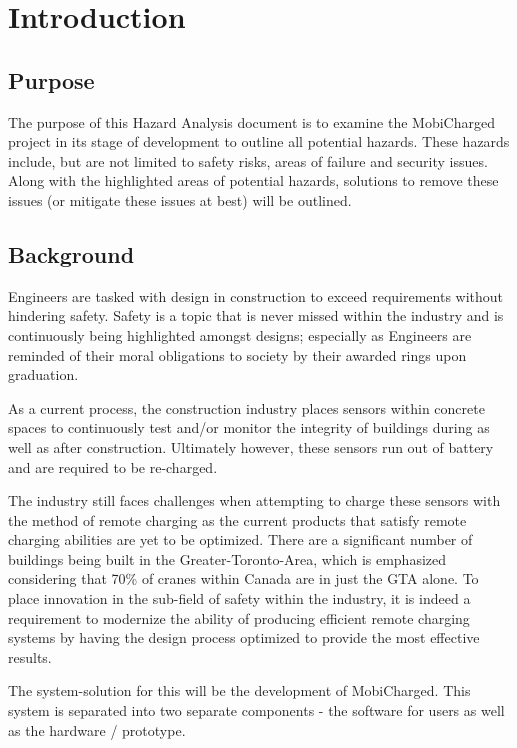 \documentclass[12pt, titlepage]{article}
\begin{document}
\section{Introduction}

\subsection{Purpose}
The purpose of this Hazard Analysis document is to examine the MobiCharged project in its stage of development to outline all potential hazards. These hazards include, but are not limited to safety risks, areas of failure and security issues. Along with the highlighted areas of potential hazards, solutions to remove these issues (or mitigate these issues at best) will be outlined.

\subsection{Background}
Engineers are tasked with design in construction to exceed requirements without hindering safety. Safety is a topic that is never missed within the industry and is continuously being highlighted amongst designs; especially as Engineers are reminded of their moral obligations to society by their awarded rings upon graduation. 
\par
As a current process, the construction industry places sensors within concrete spaces to continuously test and/or monitor the integrity of buildings during as well as after construction. Ultimately however, these sensors run out of battery and are required to be re-charged.
\par
The industry still faces challenges when attempting to charge these sensors with the method of remote charging as the current products that satisfy remote charging abilities are yet to be optimized. There are a significant number of buildings being built in the Greater-Toronto-Area, which is emphasized considering that 70\% of cranes within Canada are in just the GTA alone. To place innovation in the sub-field of safety within the industry, it is indeed a requirement to modernize the ability of producing efficient remote charging systems by having the design process optimized to provide the most effective results.
\par
The system-solution for this will be the development of MobiCharged. This system is separated into two separate components - the software for users as well as the hardware / prototype. 
\par
\end{document}
